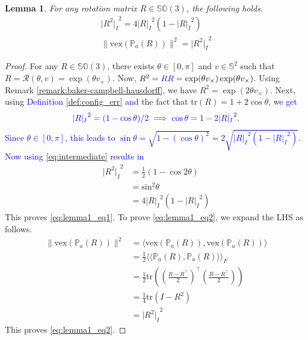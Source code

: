 \documentclass{article}
\newcommand{\SOthree}{\mathbb{SO}(3)}
\newcommand{\vex}[1]{\text{vex}\left(#1\right)}
\newtheorem{lemma}{Lemma}
\newcommand{\trace}[1]{\text{tr}\left(#1\right)}
\newcommand{\brackets}[1]{\left(#1\right)}
\newcommand{\textblue}[1]{\textcolor{blue}{#1}}
\newcommand{\normSOthree}[1]{{{\vert}#1 {\vert}_I}}
\newcommand{\cross}[1]{{#1}_\times}
\newcommand{\frobenius}[2]{\langle\langle #1, #2\rangle\rangle_F}
\newcommand{\inprod}[2]{\langle #1, #2 \rangle}
\begin{document}
\begin{lemma}\label{lemma:1}
    For any rotation matrix $R\in\SOthree$, the following holds. 
    \begin{subequations}
    \begin{align}
        \normSOthree{{R}^2}^2 = 4\normSOthree{{R}}^2\brackets{1 - \normSOthree{{R}}^2} \label{eq:lemma1_eq1}\\
        \|\vex{\mathbb{P}_a(R)}\|^2 = \normSOthree{R^2}^2 \label{eq:lemma1_eq2}
    \end{align}
    \end{subequations}
\end{lemma}
\begin{proof}
    For any $R\in\SOthree$, there exists $\theta\in[0,\pi]$ and $v\in\mathbb{S}^2$ such that $R = \mathcal{R}(\theta, v) = \exp(\theta\cross{v})$. Now, $R^2 = \textblue{RR} = \exp(\theta \cross{v})\exp(\theta \cross{v})$. Using Remark \ref{remark:baker-campbell-hausdorff}, we have $R^2 = \exp(2\theta\cross{v})$. Next, using \textblue{Definition \ref{def:config_err} and} the fact that $\trace{R} = 1 + 2\cos\theta$, \textblue{we get} 
    \begin{align}\label{eq:intermediate}
        \textblue{\normSOthree{R}^2 = (1 - \cos\theta)/2 \implies  \textblue{\cos\theta} = 1 - 2\normSOthree{R}^2}.
    \end{align}
   \textblue{ Since $\theta\in[0,\pi]$, this leads to  $\sin\theta =\sqrt{1-(\cos\theta)^2} = 2\sqrt{\normSOthree{R}^2\brackets{1 - \normSOthree{R}^2}}$. Now using \eqref{eq:intermediate} results in}
    \begin{align*}
        \normSOthree{R^2}^2 &= \frac{1}{2}\brackets{1 - \cos{2\theta}} \\
        &= \text{sin}^2{\theta} \nonumber\\
        &= 4\normSOthree{R}^2\brackets{1 - \normSOthree{R}^2}
    \end{align*}
    This proves \eqref{eq:lemma1_eq1}. To prove \eqref{eq:lemma1_eq2}, we expand the LHS as follows. 
    \begin{align*}
        \|\vex{\mathbb{P}_a(R)}\|^2 &= \inprod{\vex{\mathbb{P}_a(R)}}{\vex{\mathbb{P}_a(R)}}\\
        &= \frac{1}{2}\frobenius{\mathbb{P}_a(R)}{\mathbb{P}_a(R)}\\
        &= \frac{1}{2}\trace{\brackets{\frac{R - R^\top}{2}}^\top\brackets{\frac{R - R^\top}{2}}}\\
        &= \frac{1}{4}\trace{I - R^2}\\
        &= \normSOthree{R^2}^2
    \end{align*}
    This proves \eqref{eq:lemma1_eq2}. 
\end{proof}
\end{document}
